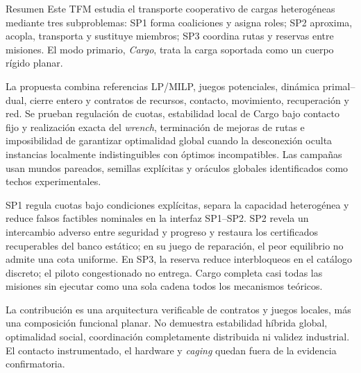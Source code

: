 \begin{viuabstract}{Resumen}
Este TFM estudia el transporte cooperativo de cargas heterogéneas mediante tres
subproblemas: SP1 forma coaliciones y asigna roles; SP2 aproxima, acopla,
transporta y sustituye miembros; SP3 coordina rutas y reservas entre misiones.
El modo primario, \emph{Cargo}, trata la carga soportada como un cuerpo rígido
planar.

La propuesta combina referencias LP/MILP, juegos potenciales, dinámica
primal--dual, cierre entero y contratos de recursos, contacto, movimiento,
recuperación y red. Se prueban regulación de cuotas, estabilidad local de Cargo
bajo contacto fijo y realización exacta del \emph{wrench}, terminación de
mejoras de rutas e imposibilidad de garantizar optimalidad global cuando la
desconexión oculta instancias localmente indistinguibles con óptimos incompatibles. Las campañas usan mundos pareados, semillas explícitas y oráculos
globales identificados como techos experimentales.

SP1 regula cuotas bajo condiciones explícitas, separa la capacidad heterogénea
y reduce falsos factibles nominales en la interfaz SP1--SP2. SP2 revela un intercambio
adverso entre seguridad y progreso y restaura los certificados recuperables del
banco estático; en su juego de reparación, el peor equilibrio no admite una
cota uniforme. En SP3, la reserva reduce
interbloqueos en el catálogo discreto; el piloto congestionado no entrega.
Cargo completa casi todas las misiones sin ejecutar como una sola cadena todos
los mecanismos teóricos.

La contribución es una arquitectura verificable de contratos y juegos locales,
más una composición funcional planar. No demuestra estabilidad híbrida global,
optimalidad social, coordinación completamente distribuida ni validez
industrial. El contacto instrumentado, el hardware y \emph{caging} quedan fuera
de la evidencia confirmatoria.

\end{viuabstract}

\clearpage

